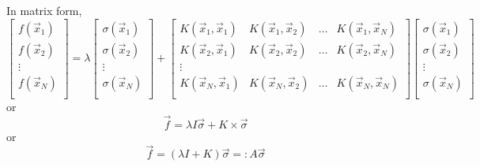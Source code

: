 In matrix form,
\begin{equation*}
    \begin{bmatrix}
        f(\vec{x}_1) \\
        f(\vec{x}_2) \\
        \vdots \\
        f(\vec{x}_N) \\
    \end{bmatrix}
    =\lambda
    \begin{bmatrix}
        \sigma(\vec{x}_1) \\
       \sigma(\vec{x}_2) \\
        \vdots \\
        \sigma(\vec{x}_N) \\
    \end{bmatrix}
    +
    \begin{bmatrix}
    K(\vec{x}_1, \vec{x}_1) & K(\vec{x}_1, \vec{x}_2) & \ldots &K(\vec{x}_1, \vec{x}_N)\\
    K(\vec{x}_2, \vec{x}_1) & K(\vec{x}_2, \vec{x}_2) & \ldots &K(\vec{x}_2, \vec{x}_N)\\
    \vdots\\
    K(\vec{x}_N, \vec{x}_1) & K(\vec{x}_N, \vec{x}_2) & \ldots &K(\vec{x}_N, \vec{x}_N)\\
    \end{bmatrix}
    \begin{bmatrix}
        \sigma(\vec{x}_1) \\
       \sigma(\vec{x}_2) \\
        \vdots \\
        \sigma(\vec{x}_N) \\
    \end{bmatrix}
\end{equation*}
or
\begin{equation*}
    \vec{f} = \lambda I \vec{\sigma} + K \times \vec{\sigma}
\end{equation*}
or
\begin{equation*}
    \vec{f} = \left( \lambda I + K \right) \vec{\sigma} =: A\vec{\sigma}
\end{equation*}


